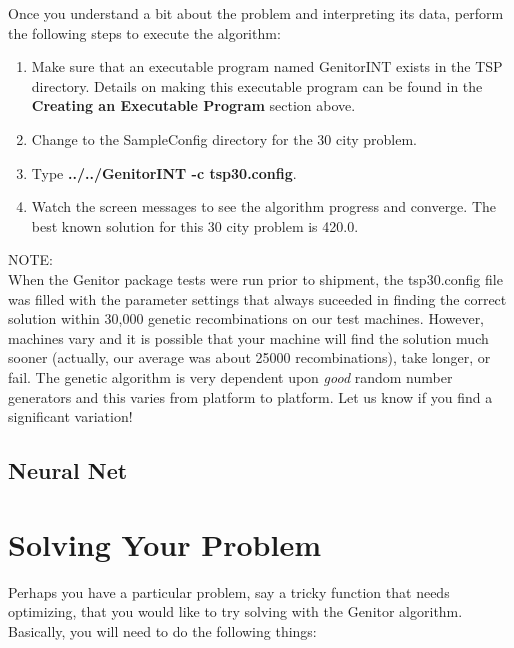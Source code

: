 Once you understand a bit about the problem and interpreting its data,
perform the following steps to execute the algorithm:
\begin{enumerate}
 \item Make sure that an executable program named GenitorINT exists in
	   the TSP directory.  Details on making this executable program
	   can be found in the {\bf Creating an Executable Program} section above.
 \item Change to the SampleConfig directory for the 30 city problem.
 \item Type {\bf ../../GenitorINT -c tsp30.config}.
 \item Watch the screen messages to see the algorithm progress and converge.
	   The best known solution for this 30 city problem is 420.0.  
\end{enumerate}

NOTE:\\
When the Genitor package tests were run prior to shipment, the tsp30.config
file was filled with the parameter settings that always suceeded in
finding the correct solution within 30,000 genetic recombinations on our
test machines.  However, machines vary and it is possible that your machine
will find the solution much sooner (actually, our average was about
25000 recombinations), take longer, or fail.  The genetic algorithm is
very dependent upon {\it good} random number generators and this 
varies from platform to platform.  Let us know if you find a significant
variation!

\subsection{Neural Net}

\section{Solving Your Problem}

Perhaps you have a particular problem, say a tricky function that needs
optimizing, that you would like to try solving with the Genitor algorithm.
Basically, you will need to do the following things:

